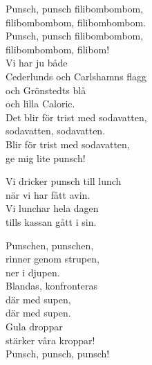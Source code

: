 \documentclass[a6paper, 10pt, twoside]{article}
\begin{document}
\begin{center}
\end{center}
\begin{lyrics}
Punsch, punsch filibombombom,\\
filibombombom, filibombombom.\\
Punsch, punsch filibombombom,\\
filibombombom, filibom!
\vspace{5pt}\\
Vi har ju både \\
Cederlunds och Carlshamns flagg\\
och Grönstedts blå\\
och lilla Caloric.\\
Det blir för trist med sodavatten,\\
sodavatten, sodavatten.\\
Blir för trist med sodavatten,\\
ge mig lite punsch!
\end{lyrics}

\noindent

\begin{center}
\end{center}
\begin{lyrics}
Vi dricker punsch till lunch\\
när vi har fått avin.\\
Vi lunchar hela dagen\\
tills kassan gått i sin.
\vspace{10pt}\\
\end{lyrics}
\vspace{40pt}
\begin{center}
\end{center}
\begin{lyrics}
Punschen, punschen,\\
rinner genom strupen, \\
ner i djupen.\\
Blandas, konfronteras\\
där med supen,\\
där med supen.\\
Gula droppar\\
stärker våra kroppar!\\
Punsch, punsch, punsch!
\end{lyrics}
\end{document}
